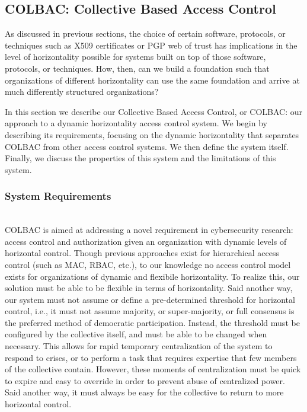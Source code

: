 \subsection{COLBAC: Collective Based Access Control}
\label{sec:colbac}
As discussed in previous sections, the choice of certain software, protocols, or
techniques such as X509 certificates or PGP web of trust has implications in the
level of horizontality possible for systems built on top of those software,
protocols, or techniques. How, then, can we build a foundation such that
organizations of different horizontality can use the same foundation and arrive
at much differently structured organizations?

In this section we describe our Collective Based Access Control, or COLBAC: our
approach to a dynamic horizontality access control system. We begin by
describing its requirements, focusing on the dynamic horizontality that
separates COLBAC from other access control systems. We then define the system
itself. Finally, we discuss the properties of this system and the limitations of
this system.

\subsubsection{System Requirements}
\mbox{}\\
COLBAC is aimed at addressing a novel requirement in cybersecurity research:
access control and authorization given an organization with dynamic levels of
horizontal control. Though previous approaches exist for hierarchical access
control (such as MAC, RBAC, etc.), to our knowledge no access control model
exists for organizations of dynamic and flexibile horizontality. To realize
this, our solution must be able to be flexible in terms of horizontality. Said
another way, our system must not assume or define a pre-determined threshold for
horizontal control, i.e., it must not assume majority, or super-majority, or
full consensus is the preferred method of democratic participation. Instead,
the threshold must be configured by the collective itself, and must be able to
be changed when necessary. This allows for rapid temporary centralization of the
system to respond to crises, or to perform a task that requires expertise that
few members of the collective contain. However, these moments of centralization
must be quick to expire and easy to override in order to prevent abuse of
centralized power. Said another way, it must always be easy for the collective
to return to more horizontal control.


